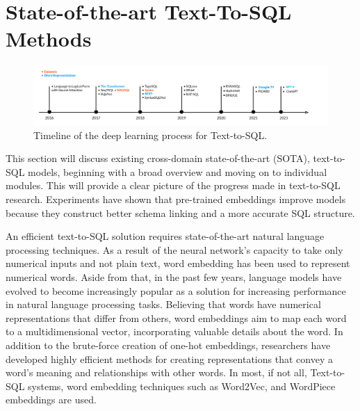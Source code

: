 \section{State-of-the-art Text-To-SQL Methods}

\begin{figure}[htb]
  \centering
  \includegraphics[width=1\textwidth]{pics/Timeline.png}
  \caption{Timeline of the deep learning process for Text-to-SQL.}
  \label{fig:timeline}
\end{figure}

This section will discuss existing cross-domain state-of-the-art (SOTA), text-to-SQL models, beginning with a broad overview and moving on to individual modules. This will provide a clear picture of the progress made in text-to-SQL research. Experiments have shown that pre-trained embeddings improve models because they construct better schema linking and a more accurate SQL structure.

An efficient text-to-SQL solution requires state-of-the-art natural language processing techniques.
As a result of the neural network's capacity to take only numerical inputs and not plain text, word embedding has been used to represent numerical words.
Aside from that, in the past few years, language models have evolved to become increasingly popular as a solution for increasing performance in natural language processing tasks.
Believing that words have numerical representations that differ from others, word embeddings aim to map each word to a multidimensional vector, incorporating valuable details about the word. In addition to the brute-force creation of one-hot embeddings, researchers have developed highly efficient methods for creating representations that convey a word's meaning and relationships with other words. In most, if not all, Text-to-SQL systems, word embedding techniques such as Word2Vec\cite{DBLP:journals/corr/Rong14}, and WordPiece embeddings\cite{DBLP:journals/corr/WuSCLNMKCGMKSJL16} are used.

